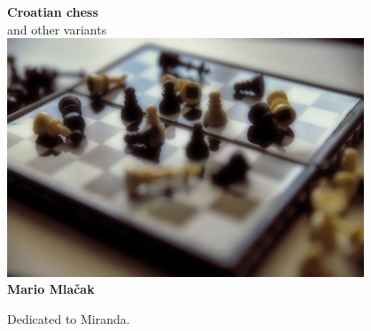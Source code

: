 \documentclass[a5paper,12pt]{book} %
\begin{document}
\setlength{\floatsep}{0.2\baselineskip} %
\setlength{\textfloatsep}{1.0\baselineskip} %
\setlength{\intextsep}{0.2\baselineskip}

\begin{titlepage}
\begin{center}
    \textbf{\huge{Croatian chess}} \\ [1.0em]
    \large{and other variants} \\ [2.0cm]

    \includegraphics[width=0.8\textwidth, keepaspectratio=true]{crochess.jpg} \\ [2.0cm]

    \textbf{\large{Mario Mlačak}} \\ [2.0cm]
\end{center}
\end{titlepage}

\thispagestyle{empty}
\vspace*{0.1\textheight}
\clearpage %

\thispagestyle{empty}
\vspace*{0.2\textheight}
\hfill{Dedicated to Miranda.}
\clearpage %
\end{document}

